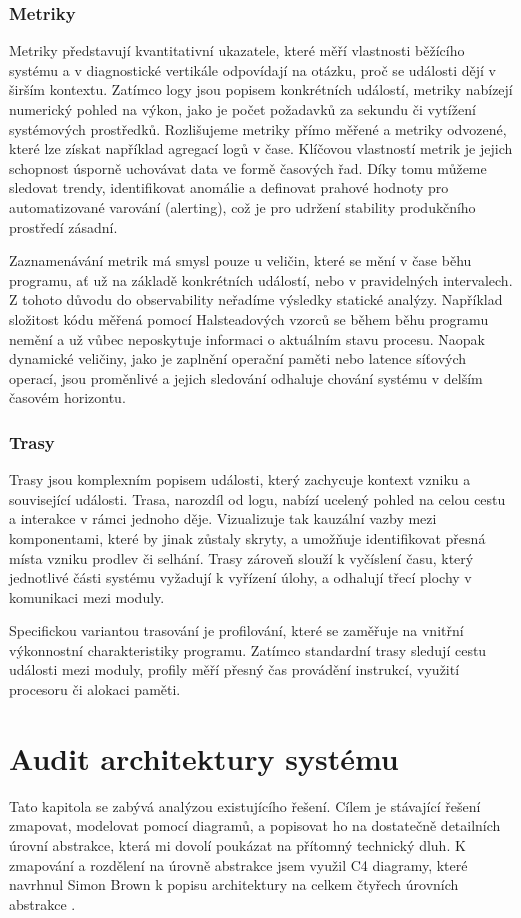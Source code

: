 \documentclass[FM,DP,fonts]{tulthesis}
\begin{document}
\subsection{Metriky}
Metriky představují kvantitativní ukazatele, které měří vlastnosti běžícího systému a v diagnostické vertikále odpovídají na otázku, proč se události dějí v širším kontextu. Zatímco logy jsou popisem konkrétních událostí, metriky nabízejí numerický pohled na výkon, jako je počet požadavků za sekundu či vytížení systémových prostředků. Rozlišujeme metriky přímo měřené a metriky odvozené, které lze získat například agregací logů v čase. Klíčovou vlastností metrik je jejich schopnost úsporně uchovávat data ve formě časových řad. Díky tomu můžeme sledovat trendy, identifikovat anomálie a definovat prahové hodnoty pro automatizované varování (alerting), což je pro udržení stability produkčního prostředí zásadní.

Zaznamenávání metrik má smysl pouze u veličin, které se mění v čase běhu programu, ať už na základě konkrétních událostí, nebo v pravidelných intervalech. Z tohoto důvodu do observability neřadíme výsledky statické analýzy. Například složitost kódu měřená pomocí Halsteadových vzorců se během běhu programu nemění a už vůbec neposkytuje informaci o aktuálním stavu procesu. Naopak dynamické veličiny, jako je zaplnění operační paměti nebo latence síťových operací, jsou proměnlivé a jejich sledování odhaluje chování systému v delším časovém horizontu.

\subsection{Trasy}
Trasy jsou komplexním popisem události, který zachycuje kontext vzniku a související události. Trasa, narozdíl od logu, nabízí ucelený pohled na celou cestu a interakce v rámci jednoho děje. Vizualizuje tak kauzální vazby mezi komponentami, které by jinak zůstaly skryty, a umožňuje identifikovat přesná místa vzniku prodlev či selhání. Trasy zároveň slouží k vyčíslení času, který jednotlivé části systému vyžadují k vyřízení úlohy, a odhalují třecí plochy v komunikaci mezi moduly. \parencite{madupati2023observability}

Specifickou variantou trasování je profilování, které se zaměřuje na vnitřní výkonnostní charakteristiky programu. Zatímco standardní trasy sledují cestu události mezi moduly, profily měří přesný čas provádění instrukcí, využití procesoru či alokaci paměti.

\chapter{Audit architektury systému}
Tato kapitola se zabývá analýzou existujícího řešení. Cílem je stávající řešení zmapovat, modelovat pomocí diagramů, a popisovat ho na dostatečně detailních úrovní abstrakce, která mi dovolí poukázat na přítomný technický dluh. K zmapování a rozdělení na úrovně abstrakce jsem využil C4 diagramy, které navrhnul Simon Brown k popisu architektury na celkem čtyřech úrovních abstrakce \parencite{c4-introduction}.
\end{document}
